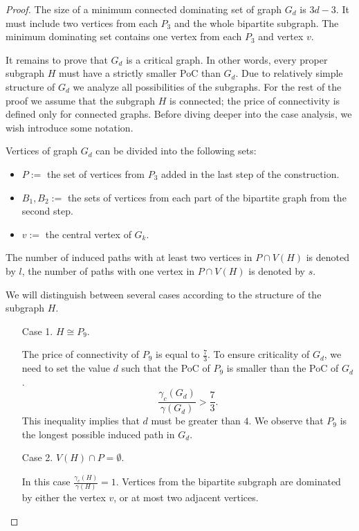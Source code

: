 \begin{proof}
	The size of a minimum connected dominating set of graph \(G_d\) is \(3d - 3\). It must include two vertices from each \(P_3\) and the whole bipartite subgraph.
	The minimum dominating set contains one vertex from each \(P_3\) and vertex \(v\).
	
	It remains to prove that \(G_d\) is a critical graph.
	In other words, every proper subgraph \(H\) must have a strictly smaller PoC than \(G_d\). 
	Due to relatively simple structure of \(G_d\) we analyze all possibilities of the subgraphs.
	For the rest of the proof we assume that the subgraph \(H\) is connected; the price of connectivity
        is defined only for connected graphs.
	Before diving deeper into the case analysis, we wish introduce some notation.
	
	Vertices of graph \(G_d\) can be divided into the following sets:
	\begin{itemize}
		\item \(P:=\) the set of vertices from \(P_3\) added in the last step of the construction.
		\item \(B_1, B_2 :=\) the sets of vertices from each part of the bipartite graph from the second step.
		\item \(v :=\) the central vertex of \(G_k\).
	\end{itemize}
	The number of induced paths with at least two vertices in \(P \cap V(H)\) is denoted by \(l\),
	the number of paths with one vertex in \(P \cap V(H)\) is denoted by \(s\).

	We will distinguish between several cases according to the structure of the subgraph \(H\).
	\begin{enumerate}
		\item [Case 1.] \(H \cong P_9.\)

		The price of connectivity of \(P_9\) is equal to \(\frac{7}{3}\).
        	To ensure criticality of \(G_d\), we need to set the value \(d\) such that the PoC of \(P_9\) is smaller than the PoC of \(G_d\).
        	\[\frac{\gamma_c(G_d)}{\gamma(G_d)} > \frac{7}{3}.\] 
        	This inequality implies that \(d\) must be greater than \(4\).
		We observe that \(P_9\) is the longest possible induced path in \(G_d\).

		\item [Case 2.] \(V(H) \cap P = \emptyset.\)
			
		In this case \(\frac{\gamma_c(H)}{\gamma(H)} = 1\).
		Vertices from the bipartite subgraph are dominated by either the vertex \(v\), or at most two adjacent vertices.
	\end{enumerate}
		

\end{proof}
